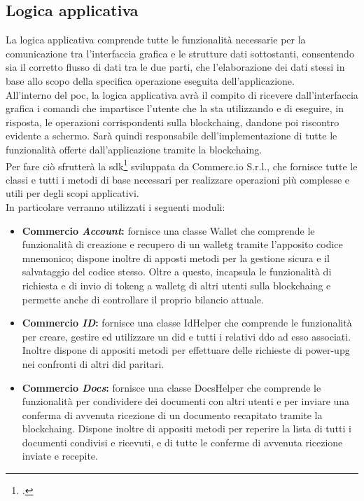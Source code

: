 \subsection{Logica applicativa}

La logica applicativa comprende tutte le funzionalità necessarie per la comunicazione tra l'interfaccia grafica e le strutture dati sottostanti, consentendo sia il corretto flusso di dati tra le due parti, che l'elaborazione dei dati stessi in base allo scopo della specifica operazione eseguita dell'applicazione.\\
All'interno del \gls{poc}, la logica applicativa avrà il compito di ricevere dall'interfaccia grafica i comandi che impartisce l'utente che la sta utilizzando e di eseguire, in risposta, le operazioni corrispondenti sulla \gls{blockchaing}, dandone poi riscontro evidente a schermo. Sarà quindi responsabile dell'implementazione di tutte le funzionalità offerte dall'applicazione tramite la \gls{blockchaing}.\\
Per fare ciò sfrutterà la \gls{sdk}\footcite{manual:sdk-commercio-network} sviluppata da Commerc.io S.r.l., che fornisce tutte le classi e tutti i metodi di base necessari per realizzare operazioni più complesse e utili per degli scopi applicativi. \\
In particolare verranno utilizzati i seguenti moduli:

\begin{itemize}
	\item \textbf{Commercio \textit{Account}:} fornisce una classe Wallet che comprende le funzionalità di creazione e recupero di un \gls{walletg} tramite l'apposito codice mnemonico; dispone inoltre di apposti metodi per la gestione sicura e il salvataggio del codice stesso. Oltre a questo, incapsula le funzionalità di richiesta e di invio di \gls{tokeng} a \gls{walletg} di altri utenti sulla \gls{blockchaing} e permette anche di controllare il proprio bilancio attuale. 
	\item \textbf{Commercio \textit{ID}:} fornisce una classe IdHelper che comprende le funzionalità per creare, gestire ed utilizzare un \gls{did} e tutti i relativi \gls{ddo} ad esso associati. Inoltre dispone di appositi metodi per effettuare delle richieste di \gls{power-upg} nei confronti di altri \gls{did} paritari.
	\item \textbf{Commercio \textit{Docs}:} fornisce una classe DocsHelper che comprende le funzionalità per condividere dei documenti con altri utenti e per inviare una conferma di avvenuta ricezione di un documento recapitato tramite la \gls{blockchaing}. Dispone inoltre di appositi metodi per reperire la lista di tutti i documenti condivisi e ricevuti, e di tutte le conferme di avvenuta ricezione inviate e recepite.
\end{itemize} 


